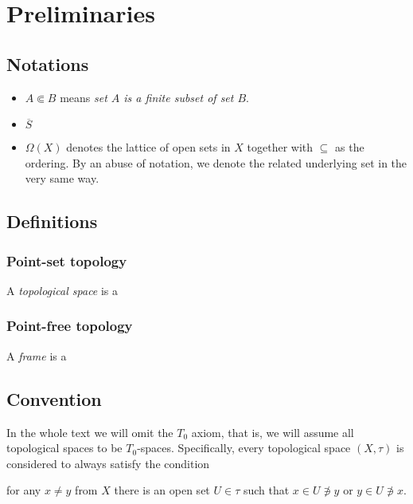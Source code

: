 \chapter*{Preliminaries}

\section*{Notations}

\begin{itemize}
\item $A \Subset B$ means {\sl set $A$ is a finite subset of set $B$\/}.
\item $\overline{S}$ 
\item $\Omega(X)$ denotes the lattice of open sets in $X$ together with
$\subseteq$ as the ordering. 
By an abuse of notation, we denote the related underlying set in the very same
way.
\end{itemize}

\section*{Definitions}

\subsection*{Point-set topology}

A \emph{topological space} is a

\subsection*{Point-free topology}

A \emph{frame} is a

\section*{Convention}

In the whole text we will omit the $T_0$ axiom, that is, we will assume all
topological spaces to be $T_0$-spaces.
Specifically, every topological space $(X, \tau)$ is considered to always
satisfy the condition
\begin{center}
  for any $x \ne y$ from $X$ there is an open set $U \in \tau$ such that $x \in U
  \not\owns y$ or $y \in U \not\owns x$.
\end{center}
